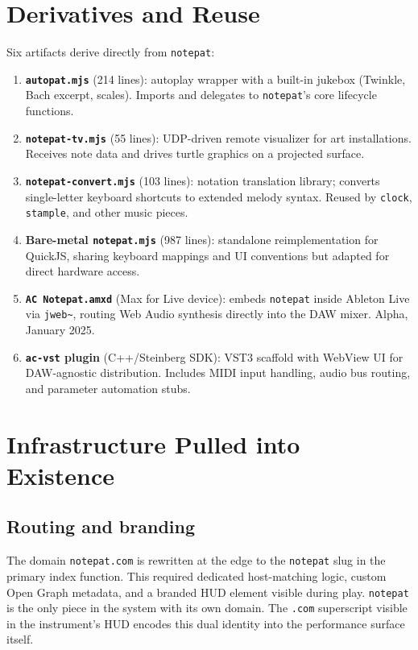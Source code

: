 \documentclass[10pt,letterpaper,twocolumn]{article}
\begin{document}
\section{Derivatives and Reuse}

Six artifacts derive directly from \texttt{notepat}:

\begin{enumerate}
  \item \textbf{\texttt{autopat.mjs}} (214 lines): autoplay wrapper with a built-in jukebox (Twinkle, Bach excerpt, scales). Imports and delegates to \texttt{notepat}'s core lifecycle functions.
  \item \textbf{\texttt{notepat-tv.mjs}} (55 lines): UDP-driven remote visualizer for art installations. Receives note data and drives turtle graphics on a projected surface.
  \item \textbf{\texttt{notepat-convert.mjs}} (103 lines): notation translation library; converts single-letter keyboard shortcuts to extended melody syntax. Reused by \texttt{clock}, \texttt{stample}, and other music pieces.
  \item \textbf{Bare-metal \texttt{notepat.mjs}} (987 lines): standalone reimplementation for QuickJS, sharing keyboard mappings and UI conventions but adapted for direct hardware access.
  \item \textbf{\texttt{AC Notepat.amxd}} (Max for Live device): embeds \texttt{notepat} inside Ableton Live via \texttt{jweb\textasciitilde}, routing Web Audio synthesis directly into the DAW mixer. Alpha, January 2025.
  \item \textbf{\texttt{ac-vst} plugin} (C++/Steinberg SDK): VST3 scaffold with WebView UI for DAW-agnostic distribution. Includes MIDI input handling, audio bus routing, and parameter automation stubs.
\end{enumerate}

\section{Infrastructure Pulled into Existence}

\subsection{Routing and branding}

The domain \texttt{notepat.com} is rewritten at the edge to the \texttt{notepat} slug in the primary index function. This required dedicated host-matching logic, custom Open Graph metadata, and a branded HUD element visible during play. \texttt{notepat} is the only piece in the system with its own domain. The \texttt{.com} superscript visible in the instrument's HUD encodes this dual identity into the performance surface itself.
\end{document}
